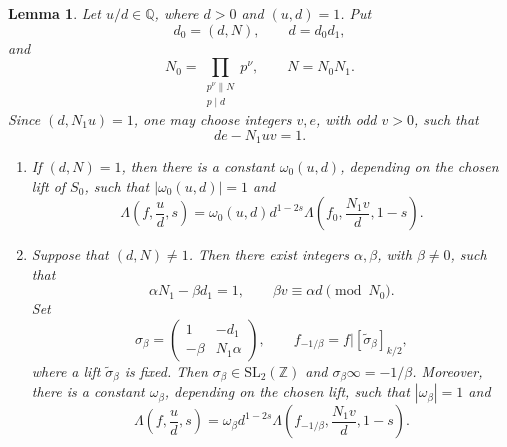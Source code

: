 \documentclass[10pt,a4paper]{amsart}
\newtheorem{lemma}[theorem]{Lemma}
\newcommand{\Q}{\mathbb Q}
\newcommand{\Z}{\mathbb Z}
\newcommand{\wt}{\widetilde}
\begin{document}
\begin{lemma}\label{lem:additive-fe}
Let $u/d\in\Q$, where $d>0$ and $(u,d)=1$. Put
\[
d_0=(d,N),\qquad d=d_0d_1,
\]
and
\[
N_0=\prod_{\substack{p^\nu\parallel N\\p\mid d}}p^\nu,
\qquad N=N_0N_1.
\]
Since $(d,N_1u)=1$, one may choose integers $v,e$, with odd $v>0$, such that
\[
de-N_1uv=1.
\]
\begin{enumerate}[label=\textup{(\arabic*)}]
\item If $(d,N)=1$, then there is a constant $\omega_0(u,d)$, depending on the chosen lift of $S_0$, such that $|\omega_0(u,d)|=1$ and
\[
\Lambda\left(f,\frac ud,s\right)
=\omega_0(u,d)d^{1-2s}
\Lambda\left(f_0,\frac{N_1v}{d},1-s\right).
\]
\item Suppose that $(d,N)\ne1$. Then there exist integers $\alpha,\beta$, with $\beta\ne0$, such that
\[
\alpha N_1-\beta d_1=1,
\qquad
\beta v\equiv\alpha d\pmod{N_0}.
\]
Set
\[
\sigma_\beta=
\begin{pmatrix}1&-d_1\\-\beta&N_1\alpha\end{pmatrix},
\qquad
f_{-1/\beta}=f|[\wt\sigma_\beta]_{k/2},
\]
where a lift $\wt\sigma_\beta$ is fixed. Then $\sigma_\beta\in\mathrm{SL}_2(\Z)$ and $\sigma_\beta\infty=-1/\beta$. Moreover, there is a constant $\omega_\beta$, depending on the chosen lift, such that $|\omega_\beta|=1$ and
\[
\Lambda\left(f,\frac ud,s\right)
=\omega_\beta d^{1-2s}
\Lambda\left(f_{-1/\beta},\frac{N_1v}{d},1-s\right).
\]
\end{enumerate}
\end{lemma}
\end{document}
